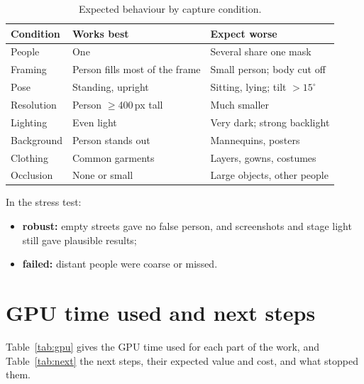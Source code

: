 \documentclass[conference,a4paper]{IEEEtran}
\begin{document}
\begin{table}[!htbp]\centering\footnotesize
\caption{Expected behaviour by capture condition.}\label{tab:capture}
\begin{tabularx}{\columnwidth}{@{}P{1.55cm}P{2.6cm}L@{}}
\toprule
\textbf{Condition} & \textbf{Works best} & \textbf{Expect worse}\\
\midrule
People & One & Several share one mask\\
Framing & Person fills most of the frame & Small person; body cut off\\
Pose & Standing, upright & Sitting, lying; tilt $>15^\circ$\\
Resolution & Person $\geq$400\,px tall & Much smaller\\
Lighting & Even light & Very dark; strong backlight\\
Background & Person stands out & Mannequins, posters\\
Clothing & Common garments & Layers, gowns, costumes\\
Occlusion & None or small & Large objects, other people\\
\bottomrule
\end{tabularx}
\end{table}

\noindent In the stress test:
\begin{itemize}
  \item \textbf{robust:} empty streets gave no false person, and screenshots and stage light still gave plausible results;
  \item \textbf{failed:} distant people were coarse or missed.
\end{itemize}

\section{GPU time used and next steps}
\label{sec:future}

Table~\ref{tab:gpu} gives the GPU time used for each part of the work, and Table~\ref{tab:next} the next steps, their expected value and cost, and what stopped them.
\end{document}
